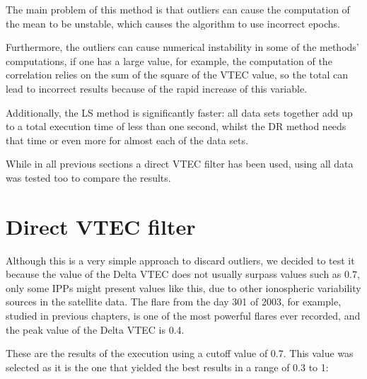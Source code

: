 The main problem of this method is that outliers can cause the computation of the mean to be unstable, which causes the algorithm to use incorrect epochs.

Furthermore, the outliers can cause numerical instability in some of the methods' computations, if one has a large value, for example, the computation of the correlation relies on the sum of the square of the VTEC value, so the total can lead to incorrect results because of the rapid increase of this variable.

Additionally, the LS method is significantly faster: all data sets together add up to a total execution time of less than one second, whilst the DR method needs that time or even more for almost each of the data sets.

While in all previous sections a direct VTEC filter has been used, using all data was tested too to compare the results.

\clearpage

\section{Direct VTEC filter}

Although this is a very simple approach to discard outliers, we decided to test it because the value of the Delta VTEC does not usually surpass values such as 0.7, only some IPPs might present values like this, due to other ionospheric variability sources in the satellite data. The flare from the day 301 of 2003, for example, studied in previous chapters, is one of the most powerful flares ever recorded, and the peak value of the Delta VTEC is 0.4.

These are the results of the execution using a cutoff value of 0.7. This value was selected as it is the one that yielded the best results in a range of 0.3 to 1:

